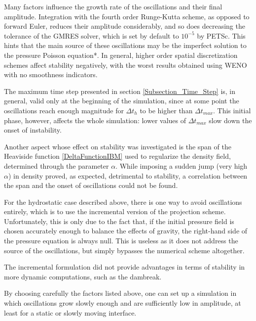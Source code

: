 \documentclass[11pt, a4paper, oneside, openany]{book}
\begin{document}
Many factors influence the growth rate of the oscillations and their final amplitude. Integration with the fourth order Runge-Kutta scheme, as opposed to forward Euler, reduces their amplitude considerably, and so does decreasing the tolerance of the GMRES solver, which is set by default to $10^{-5}$ by PETSc. This hints that the main source of these oscillations may be the imperfect solution to the pressure Poisson equation*. In general, higher order spatial discretization schemes affect stability negatively, with the worst results obtained using WENO with no smoothness indicators.\par
The maximum time step presented in section \ref{Subsection_Time_Step} is, in general, valid only at the beginning of the simulation, since at some point the oscillations reach enough magnitude for $\Delta t_{h}$ to be higher than $\Delta t_{max}$. This initial phase, however, affects the whole simulation: lower values of $\Delta t_{max}$ slow down the onset of instability.\par
Another aspect whose effect on stability was investigated is the span of the Heaviside function \eqref{DeltaFunctionIBM} used to regularize the density field, determined through the parameter $\alpha$. While imposing a sudden jump (very high $\alpha$) in density proved, as expected, detrimental to stability, a correlation between the span and the onset of oscillations could not be found.\par
For the hydrostatic case described above, there is one way to avoid oscillations entirely, which is to use the incremental version of the projection scheme. Unfortunately, this is only due to the fact that, if the initial pressure field is chosen accurately enough to balance the effects of gravity, the right-hand side of the pressure equation is always null. This is useless as it does not address the source of the oscillations, but simply bypasses the numerical scheme altogether.\par
The incremental formulation did not provide advantages in terms of stability in more dynamic computations, such as the dambreak.\par
By choosing carefully the factors listed above, one can set up a simulation in which oscillations grow slowly enough and are sufficiently low in amplitude, at least for a static or slowly moving interface.
\end{document}
